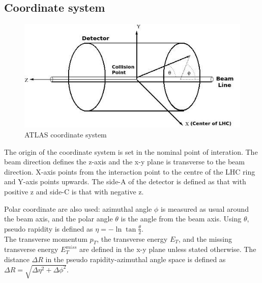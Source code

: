\documentclass[a4paper, oneside]{book}
\begin{document}
			\subsection{Coordinate system}
			\begin{figure}
				\centering
				\includegraphics[width=0.3\textheight]{tesi_images/atlas_coord.jpeg}
				\caption{ATLAS coordinate system}
			\end{figure}
			\cite{ATLAS config}The origin of the coordinate system is set in the nominal point of interation. The beam direction defines the z-axis and the x-y plane is transverse to the beam direction. X-axis points from the interaction point to the centre of the LHC ring and Y-axis points upwards. The side-A of the detector is defined as that with positive z and side-C is that with negative z.
			
			Polar coordinate are also used: azimuthal angle $\phi$ is measured as usual around the beam axis, and the polar angle $\theta$ is the angle from the beam axis. Using $\theta$, pseudo rapidity is defined as $\eta= -\ln{\tan{\frac{\theta}{2}}}$. \\
			The transverse momentum $p_T$, the transverse energy $E_T$, and the missing transverse energy $E_T^{miss}$ are defined in the x-y plane unless stated otherwise.  The distance $\Delta R$ in the pseudo rapidity-azimuthal angle space is defined as $\Delta R = \sqrt{\Delta \eta^2 + \Delta \phi^2 }$.
\end{document}
